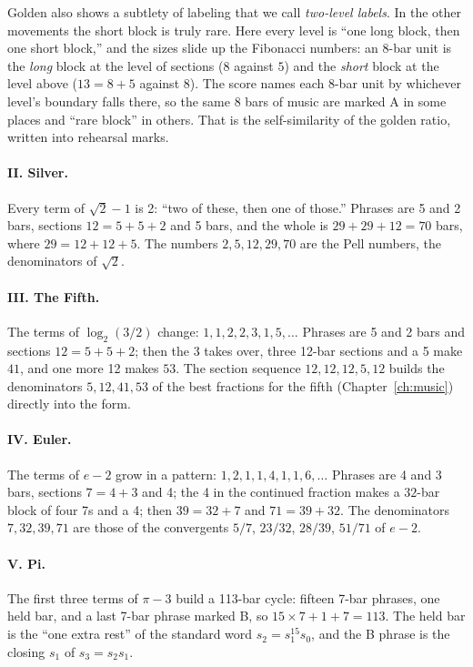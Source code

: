 Golden also shows a subtlety of labeling that we call \emph{two-level labels}. In the other movements the short block is truly rare. Here every level is ``one long block, then one short block,'' and the sizes slide up the Fibonacci numbers: an 8-bar unit is the \emph{long} block at the level of sections ($8$ against $5$) and the \emph{short} block at the level above ($13 = 8 + 5$ against $8$). The score names each 8-bar unit by whichever level's boundary falls there, so the same 8 bars of music are marked A in some places and ``rare block'' in others. That is the self-similarity of the golden ratio, written into rehearsal marks.

\paragraph{II. Silver.} Every term of $\sqrt2 - 1$ is 2: ``two of these, then one of those.'' Phrases are 5 and 2 bars, sections $12 = 5 + 5 + 2$ and 5 bars, and the whole is $29 + 29 + 12 = 70$ bars, where $29 = 12 + 12 + 5$. The numbers $2, 5, 12, 29, 70$ are the Pell numbers, the denominators of $\sqrt 2$.

\paragraph{III. The Fifth.} The terms of $\log_2(3/2)$ change: $1, 1, 2, 2, 3, 1, 5, \dots$ Phrases are 5 and 2 bars and sections $12 = 5 + 5 + 2$; then the 3 takes over, three 12-bar sections and a 5 make $41$, and one more 12 makes $53$. The section sequence $12, 12, 12, 5, 12$ builds the denominators $5, 12, 41, 53$ of the best fractions for the fifth (Chapter~\ref{ch:music}) directly into the form.

\paragraph{IV. Euler.} The terms of $e - 2$ grow in a pattern: $1, 2, 1, 1, 4, 1, 1, 6, \dots$ Phrases are 4 and 3 bars, sections $7 = 4 + 3$ and 4; the 4 in the continued fraction makes a $32$-bar block of four 7s and a 4; then $39 = 32 + 7$ and $71 = 39 + 32$. The denominators $7, 32, 39, 71$ are those of the convergents $5/7$, $23/32$, $28/39$, $51/71$ of $e - 2$.

\paragraph{V. Pi.} The first three terms of $\pi - 3$ build a 113-bar cycle: fifteen 7-bar phrases, one held bar, and a last 7-bar phrase marked B, so $15 \times 7 + 1 + 7 = 113$. The held bar is the ``one extra rest'' of the standard word $s_2 = s_1^{15}s_0$, and the B phrase is the closing $s_1$ of $s_3 = s_2 s_1$.

